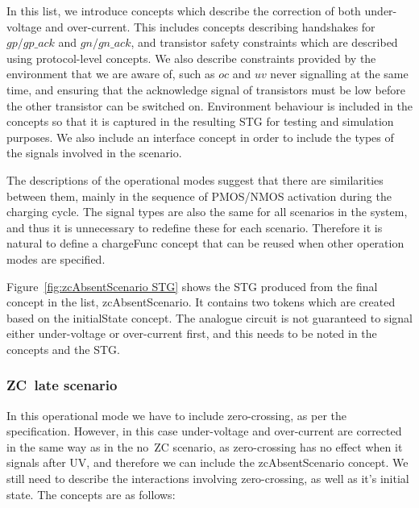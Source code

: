 \documentclass[british,compsoc]{IEEEtran}
\begin{document}
In this list, we introduce concepts which describe the correction
of both under-voltage and over-current. This includes concepts describing
handshakes for $gp/gp\_ack$ and $gn/gn\_ack$, and transistor safety
constraints which are described using protocol-level concepts. We
also describe constraints provided by the environment that we are
aware of, such as $oc$ and $uv$ never signalling at the same time, and ensuring that
the acknowledge signal of transistors must be low before the other transistor can be switched on.
Environment behaviour is included in the concepts so that it is captured in the resulting STG for testing and simulation purposes.
We also include an \textsf{interface} concept in order to include the
types of the signals involved in the scenario.

The descriptions of the operational modes suggest that there are similarities
between them, mainly in the sequence of PMOS/NMOS activation during
the charging cycle. The signal types are also the same for all scenarios in the system, and
thus it is unnecessary to redefine these for each scenario.
Therefore it is natural to define a \textsf{chargeFunc}
concept that can be reused when other operation modes are specified.


Figure~\ref{fig:zcAbsentScenario STG} shows the STG produced from
the final concept in the list, \textsf{zcAbsentScenario}. It contains
two tokens which are created based on the \textsf{initialState} concept.
The analogue circuit is not guaranteed to signal either under-voltage
or over-current first, and this needs to be noted in the concepts
and the STG.

\subsubsection{ZC~late scenario}

In this operational mode we have to include zero-crossing, as per
the specification. However, in this case under-voltage and over-current
are corrected in the same way as in the no~ZC scenario, as zero-crossing has no effect when it signals after UV, and therefore
we can include the \textsf{zcAbsentScenario} concept. We still need
to describe the interactions involving zero-crossing, as well as it's initial state. The concepts
are as follows:
\end{document}
